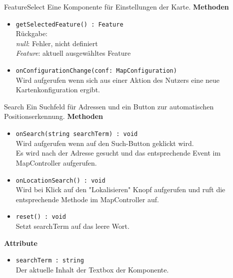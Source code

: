     \begin{Class}{FeatureSelect}
        Eine Komponente für Einstellungen der Karte.
        \textbf{Methoden}
        \begin{itemize}
            \item \texttt{getSelectedFeature() : Feature}
            \\ Rückgabe:
            \\ \emph{null}: Fehler, nicht definiert
            \\ \emph{Feature}: aktuell ausgewähltes Feature
            \item \texttt{onConfigurationChange(conf: MapConfiguration)}
            \\ Wird aufgerufen wenn sich aus einer Aktion des Nutzers eine neue Kartenkonfiguration ergibt.
        \end{itemize}
    \end{Class}

    \begin{Class}{Search}
        Ein Suchfeld für Adressen und ein Button zur automatischen Positionserkennung.
        \textbf{Methoden}
        \begin{itemize}
            \item \texttt{onSearch(string searchTerm) : void}
            \\ Wird aufgerufen wenn auf den Such-Button geklickt wird.
            \\ Es wird nach der Adresse gesucht und das entsprechende Event im MapController aufgerufen.
            \item \texttt{onLocationSearch() : void}
            \\ Wird bei Klick auf den "Lokalisieren" Knopf aufgerufen und ruft die entsprechende Methode im MapController auf.
            \item \texttt{reset() : void}
            \\ Setzt searchTerm auf das leere Wort.
        \end{itemize}
        \textbf{Attribute}
        \begin{itemize}
            \item \texttt{searchTerm : string}
            \\ Der aktuelle Inhalt der Textbox der Komponente.
        \end{itemize}
    \end{Class}
    
